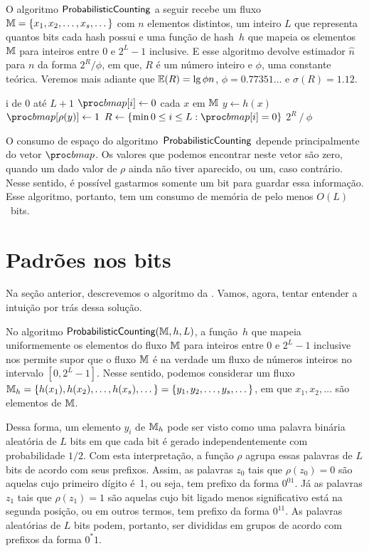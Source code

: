O algoritmo $\textsf{ProbabilisticCounting}$ a seguir recebe um fluxo $\mathbb{M} = \{ x_1, x_2, \dots, x_s, \dots \}$ com $n$ elementos distintos, 
um inteiro $L$ que representa quantos bits cada hash possui e uma função de hash~$h$ que mapeia os elementos $\mathbb{M}$ 
para inteiros entre $0$ e $2^L - 1$ inclusive. E esse algoritmo devolve estimador $\hat{n}$ para $n$ da forma 
$2^{R}/\phi$, em que, $R$ é um número inteiro e $\phi$, uma constante teórica. Veremos mais adiante que 
$\mathbb{E}(R) = \lg \phi n$, $\phi = 0.77351{\dots}$ e $\sigma(R) = 1.12$.

\begin{codebox}
  \li \For i de $0$ até $L + 1$
      \Do
  \li    $\bitmap[i] \gets 0$
      \End
  \li \For cada $x$ em $\mathbb{M}$                               \label{li:pc:for:start}
      \Do
  \li   $y \gets h(x)$
  \li   $\bitmap[\rho(y)] \gets 1$                          \label{li:pc:for:end}
      \End
  \li $R \gets \{ \min 0 \leq i \leq L: \bitmap[i] = 0 \}$  \label{li:pc:r:def}
  \li\Return $2^R \mathbin{/} \phi$
  \End
\end{codebox}

O consumo de espaço do algoritmo~$\textsf{ProbabilisticCounting}$ depende principalmente do vetor $\bitmap$. Os valores que podemos encontrar neste
vetor são zero, quando um dado valor de $\rho$ ainda não tiver aparecido, ou um, caso contrário. Nesse sentido, é 
possível gastarmos somente um bit para guardar essa informação. Esse algoritmo, portanto, tem um consumo de memória de 
pelo menos $O(L)$~bits.

\section{Padrões nos bits}
\label{sec:flajolet-martin:pattern}

Na seção anterior, descrevemos o algoritmo da . Vamos, agora, tentar entender a intuição
por trás dessa solução.

No algoritmo $\textsf{ProbabilisticCounting}(\mathbb{M}, h, L)$, a função~$h$ que mapeia uniformemente os elementos do fluxo $\mathbb{M}$ para inteiros entre 
$0$ e $2^L - 1$ inclusive nos permite supor que o fluxo $\mathbb{M}$ é na verdade um fluxo de números inteiros no intervalo 
$[0, 2^L - 1]$. Nesse sentido, podemos considerar um fluxo $\mathbb{M}_h = \{ h(x_1), h(x_2), \dots, h(x_s), \dots \} = 
\{ y_1, y_2, \dots, y_s, \dots \} $, em que $x_1, x_2, \dots$ são elementos de $\mathbb{M}$.

Dessa forma, um elemento $y_i$ de $\mathbb{M}_h$ pode ser visto como uma palavra binária aleatória de $L$ bits em que cada bit 
é gerado independentemente com probabilidade $1/2$. Com esta interpretação, a função $\rho$ agrupa essas palavras de $L$ 
bits de acordo com seus prefixos. Assim, as palavras $z_0$ tais que $\rho(z_0) = 0$ são aquelas cujo primeiro dígito 
é~1, ou seja, tem prefixo da forma $0^01$. Já as palavras $z_1$ tais que $\rho(z_1) = 1$ são aquelas cujo bit ligado 
menos significativo está na segunda posição, ou em outros termos, tem prefixo da forma $0^11$. As palavras aleatórias de 
$L$ bits podem, portanto, ser divididas em grupos de acordo com prefixos da forma $0^{*}1$.


